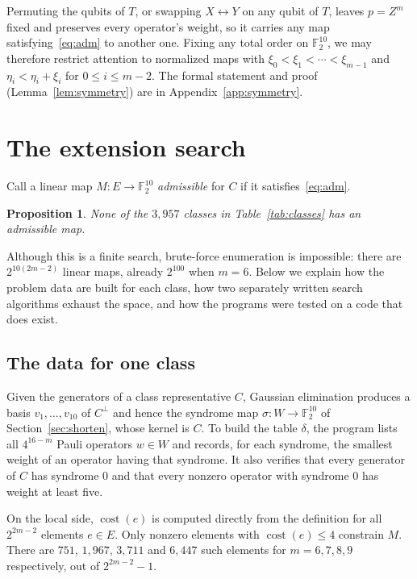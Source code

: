 \documentclass[11pt]{article}
\newtheorem{proposition}[theorem]{Proposition}
\theoremstyle{definition}
\theoremstyle{remark}
\newcommand{\F}{\mathbb F_2}
\newcommand{\cost}{\operatorname{cost}}
\begin{document}
Permuting the qubits of \(T\), or swapping \(X\leftrightarrow Y\) on any
qubit of \(T\), leaves \(p=Z^m\) fixed and preserves every operator's
weight, so it carries any map satisfying~\eqref{eq:adm} to another one.
Fixing any total order on \(\F^{10}\), we may therefore restrict attention
to normalized maps with \(\xi_0<\xi_1<\cdots<\xi_{m-1}\) and
\(\eta_i<\eta_i+\xi_i\) for \(0\leq i\leq m-2\). The formal statement
and proof (Lemma~\ref{lem:symmetry}) are in Appendix~\ref{app:symmetry}.

\section{The extension search}\label{sec:search}

Call a linear map \(M:E\to\F^{10}\) \emph{admissible} for \(C\) if it
satisfies~\eqref{eq:adm}.

\begin{proposition}\label{prop:search}
None of the \(3{,}957\) classes in Table~\ref{tab:classes} has an
admissible map.
\end{proposition}

Although this is a finite search, brute-force enumeration is impossible:
there are \(2^{10(2m-2)}\) linear maps, already \(2^{100}\) when
\(m=6\). Below we explain how the problem data are built for each class,
how two separately written search algorithms exhaust the space, and how
the programs were tested on a code that does exist.

\subsection{The data for one class}

Given the generators of a class representative \(C\), Gaussian
elimination produces a basis \(v_1,\ldots,v_{10}\) of \(C^\perp\) and
hence the syndrome map \(\sigma:W\to\F^{10}\) of
Section~\ref{sec:shorten}, whose kernel is \(C\). To build the table
\(\delta\), the program lists all \(4^{16-m}\) Pauli operators
\(w\in W\) and records, for each syndrome, the smallest weight of an
operator having that syndrome. It also verifies that every generator of
\(C\) has syndrome \(0\) and that every nonzero operator with syndrome
\(0\) has weight at least five.

On the local side, \(\cost(e)\) is computed directly from the definition
for all \(2^{2m-2}\) elements \(e\in E\). Only nonzero elements with
\(\cost(e)\leq4\) constrain \(M\). There are \(751\), \(1{,}967\),
\(3{,}711\) and \(6{,}447\) such elements for \(m=6,7,8,9\)
respectively, out of \(2^{2m-2}-1\).
\end{document}
